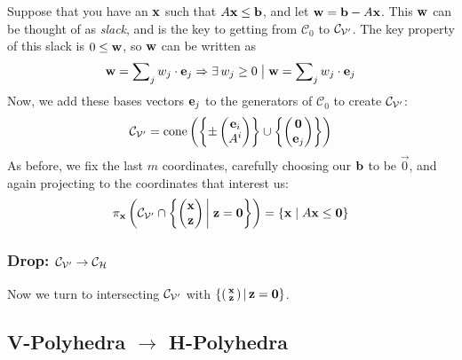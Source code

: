 Suppose that you have an $\mathbf{x}$ such that $A\mathbf{x} \leq \mathbf{b}$, and let $\mathbf{w} = \mathbf{b} - A\mathbf{x}$.  This $\mathbf{w}$ can be thought of as \textit{slack}, and is the key to getting from $\mathcal{C}_0$ to $\mathcal{C}_{\mathcal{V'}}$.  The key property of this slack is $0 \leq \mathbf{w}$, so $\mathbf{w}$ can be written as
  \[ \mathbf{w} = \sum\nolimits_j w_j\cdot\mathbf{e}_j 
          \Rightarrow \exists\,w_j \geq 0 \;\big|\; \mathbf{w} = \sum\nolimits_j w_j\cdot\mathbf{e}_j \]
Now, we add these bases vectors $\mathbf{e}_j$ to the generators of $\mathcal{C}_0$ to create $\mathcal{C}_{\mathcal{V'}}$:
  \[ \mathcal{C}_{\mathcal{V'}} = \operatorname{cone}\left(\left\{\pm\begin{pmatrix}\mathbf{e}_i \\ A^i\end{pmatrix}\right\} \cup 
                 \left\{\begin{pmatrix}\mathbf{0} \\ \mathbf{e}_j\end{pmatrix}\right\}\right) 
  \]
As before, we fix the last $m$ coordinates, carefully choosing our $\mathbf{b}$ to be $\vec{0}$, and again projecting to the coordinates that interest us:
  \[ \pi_{\mathbf{x}} \left( \mathcal{C}_{\mathcal{V'}} \cap \left\{\begin{pmatrix}\mathbf{x} \\ \mathbf{z}\end{pmatrix} \bigg|\; \mathbf{z} = \mathbf{0}\right\} \right) = 
               \{\mathbf{x} \;|\; A\mathbf{x} \leq \mathbf{0}\}
  \]

\subsubsection{Drop: $\mathcal{C}_{\mathcal{V'}} \to \mathcal{C}_{\mathcal{H}}$}
Now we turn to intersecting $\mathcal{C}_{\mathcal{V'}}$ with $\left\{\left(\begin{smallmatrix}\mathbf{x} \\ \mathbf{z}\end{smallmatrix}\right) |\, \mathbf{z} = \mathbf{0}\right\}$.

\subsection{V-Polyhedra $\to$ H-Polyhedra}

